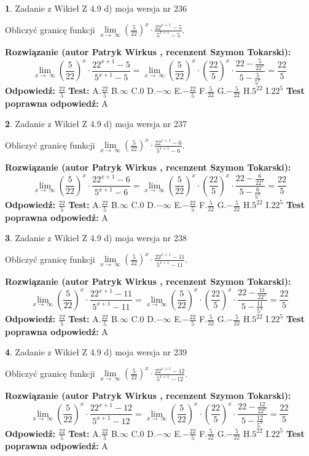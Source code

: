 \documentclass[12pt, a4paper]{article}
\theoremstyle{definition} %
\newtheorem{zad}{}
\newcommand{\zadStart}[1]{\begin{zad}#1\newline}
\newcommand{\zadStop}{\end{zad}}
\newcommand{\rozwStart}[2]{\noindent \textbf{Rozwiązanie (autor #1 , recenzent #2): }\newline}
\newcommand{\rozwStop}{\newline}
\newcommand{\odpStart}{\noindent \textbf{Odpowiedź:}\newline}
\newcommand{\odpStop}{\newline}
\newcommand{\testStart}{\noindent \textbf{Test:}\newline}
\newcommand{\testStop}{\newline}
\newcommand{\kluczStart}{\noindent \textbf{Test poprawna odpowiedź:}\newline}
\newcommand{\kluczStop}{\newline}
\begin{document}
\zadStart{Zadanie z Wikieł Z 4.9 d) moja wersja nr 236}


Obliczyć granicę funkcji  $\lim\limits_{x\to\ \infty}(\frac{5}{22})^{x}\cdot\frac{22^{x+1}-5}{5^{x+1}-5}$.
\zadStop
\rozwStart{Patryk Wirkus}{Szymon Tokarski}
$$\lim\limits_{x\to\ \infty}(\frac{5}{22})^{x}\cdot\frac{22^{x+1}-5}{5^{x+1}-5}=\lim\limits_{x\to\ \infty}(\frac{5}{22})^{x}\cdot(\frac{22}{5})^{x} \cdot \frac{22-\frac{5}{22^{x}}}{5-\frac{5}{5^{x}}} = \frac{22}{5}$$
\rozwStop
\odpStart
$\frac{22}{5}$
\odpStop
\testStart
A.$\frac{22}{5}$ B.$\infty$ C.$0$ D.$-\infty$ E.$-\frac{22}{5}$
F.$\frac{5}{22}$ G.$-\frac{5}{22}$
H.$5^{22}$
I.$22^{5}$
\testStop
\kluczStart
A
\kluczStop



\zadStart{Zadanie z Wikieł Z 4.9 d) moja wersja nr 237}


Obliczyć granicę funkcji  $\lim\limits_{x\to\ \infty}(\frac{5}{22})^{x}\cdot\frac{22^{x+1}-6}{5^{x+1}-6}$.
\zadStop
\rozwStart{Patryk Wirkus}{Szymon Tokarski}
$$\lim\limits_{x\to\ \infty}(\frac{5}{22})^{x}\cdot\frac{22^{x+1}-6}{5^{x+1}-6}=\lim\limits_{x\to\ \infty}(\frac{5}{22})^{x}\cdot(\frac{22}{5})^{x} \cdot \frac{22-\frac{6}{22^{x}}}{5-\frac{6}{5^{x}}} = \frac{22}{5}$$
\rozwStop
\odpStart
$\frac{22}{5}$
\odpStop
\testStart
A.$\frac{22}{5}$ B.$\infty$ C.$0$ D.$-\infty$ E.$-\frac{22}{5}$
F.$\frac{5}{22}$ G.$-\frac{5}{22}$
H.$5^{22}$
I.$22^{5}$
\testStop
\kluczStart
A
\kluczStop



\zadStart{Zadanie z Wikieł Z 4.9 d) moja wersja nr 238}


Obliczyć granicę funkcji  $\lim\limits_{x\to\ \infty}(\frac{5}{22})^{x}\cdot\frac{22^{x+1}-11}{5^{x+1}-11}$.
\zadStop
\rozwStart{Patryk Wirkus}{Szymon Tokarski}
$$\lim\limits_{x\to\ \infty}(\frac{5}{22})^{x}\cdot\frac{22^{x+1}-11}{5^{x+1}-11}=\lim\limits_{x\to\ \infty}(\frac{5}{22})^{x}\cdot(\frac{22}{5})^{x} \cdot \frac{22-\frac{11}{22^{x}}}{5-\frac{11}{5^{x}}} = \frac{22}{5}$$
\rozwStop
\odpStart
$\frac{22}{5}$
\odpStop
\testStart
A.$\frac{22}{5}$ B.$\infty$ C.$0$ D.$-\infty$ E.$-\frac{22}{5}$
F.$\frac{5}{22}$ G.$-\frac{5}{22}$
H.$5^{22}$
I.$22^{5}$
\testStop
\kluczStart
A
\kluczStop



\zadStart{Zadanie z Wikieł Z 4.9 d) moja wersja nr 239}


Obliczyć granicę funkcji  $\lim\limits_{x\to\ \infty}(\frac{5}{22})^{x}\cdot\frac{22^{x+1}-12}{5^{x+1}-12}$.
\zadStop
\rozwStart{Patryk Wirkus}{Szymon Tokarski}
$$\lim\limits_{x\to\ \infty}(\frac{5}{22})^{x}\cdot\frac{22^{x+1}-12}{5^{x+1}-12}=\lim\limits_{x\to\ \infty}(\frac{5}{22})^{x}\cdot(\frac{22}{5})^{x} \cdot \frac{22-\frac{12}{22^{x}}}{5-\frac{12}{5^{x}}} = \frac{22}{5}$$
\rozwStop
\odpStart
$\frac{22}{5}$
\odpStop
\testStart
A.$\frac{22}{5}$ B.$\infty$ C.$0$ D.$-\infty$ E.$-\frac{22}{5}$
F.$\frac{5}{22}$ G.$-\frac{5}{22}$
H.$5^{22}$
I.$22^{5}$
\testStop
\kluczStart
A
\kluczStop
\end{document}
